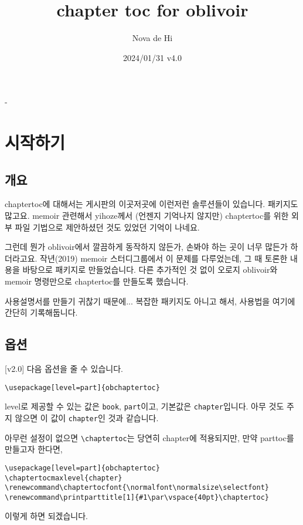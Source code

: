 \documentclass[chapter,a4paper,oneside,colorlinks]{oblivoir}
\renewcommand*\chaptertocfont{\small}
\begin{document}
\calccentering{\unitlength}

\title{chapter toc for oblivoir}
\author{Nova de Hi}
\date{2024/01/31 \quad v4.0}
\begin{adjustwidth}{\unitlength}{-\unitlength}
\maketitle
\end{adjustwidth}

\tableofcontents

\chapter{시작하기}

\section{개요}
chaptertoc에 대해서는 게시판의 이곳저곳에 이런저런 솔루션들이 있습니다. 패키지도 많고요. memoir 관련해서 yihoze께서 (언젠지 기억나지 않지만) chaptertoc를 위한 외부 파일 기법으로 제안하셨던 것도 있었던 기억이 나네요.

그런데 뭔가 oblivoir에서 깔끔하게 동작하지 않든가, 손봐야 하는 곳이 너무 많든가 하더라고요. 작년(2019) memoir 스터디그룹에서 이 문제를 다루었는데, 그 때 토론한 내용을 바탕으로 패키지로 만들었습니다. 다른 추가적인 것 없이 오로지 oblivoir와 memoir 명령만으로 chaptertoc를 만들도록 했습니다.

사용설명서를 만들기 귀찮기 때문에... 복잡한 패키지도 아니고 해서, 사용법을 여기에 간단히 기록해둡니다.

\section{옵션}

[v2.0] 다음 옵션을 줄 수 있습니다.
\begin{Verbatim}[baselinestretch=1.05]
\usepackage[level=part]{obchaptertoc}
\end{Verbatim}

level로 제공할 수 있는 값은 \verb|book|, \verb|part|이고, 기본값은 \verb|chapter|입니다.
아무 것도 주지 않으면 이 값이 \verb|chapter|인 것과 같습니다.

아무런 설정이 없으면 \verb|\chaptertoc|는 당연히 chapter에 적용되지만, 만약 parttoc를 만들고자 한다면, 
\begin{Verbatim}[baselinestretch=1.05]
\usepackage[level=part]{obchaptertoc}
\chaptertocmaxlevel{chapter}
\renewcommand\chaptertocfont{\normalfont\normalsize\selectfont}
\renewcommand\printparttitle[1]{#1\par\vspace{40pt}\chaptertoc}
\end{Verbatim}
이렇게 하면 되겠습니다.
\end{document}

